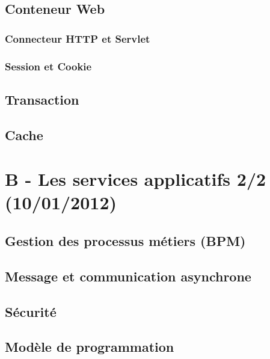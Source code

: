 \subsection{Conteneur Web}
\subsubsection{Connecteur HTTP et Servlet}
\subsubsection{Session et Cookie}

\subsection{Transaction}

\subsection{Cache}

\section{B - Les services applicatifs 2/2 (10/01/2012)}
\subsection{Gestion des processus métiers (BPM)}

\subsection{Message et communication asynchrone}

\subsection{Sécurité}
\subsection{Modèle de programmation}

